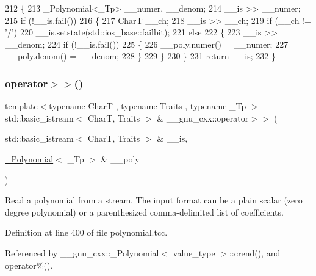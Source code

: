 \begin{DoxyCode}
212     \{
213       \_Polynomial<\_Tp> \_\_numer, \_\_denom;
214       \_\_is >> \_\_numer;
215       \textcolor{keywordflow}{if} (!\_\_is.fail())
216         \{
217           CharT \_\_ch;
218           \_\_is >> \_\_ch;
219           \textcolor{keywordflow}{if} (\_\_ch != \textcolor{charliteral}{'/'})
220             \_\_is.setstate(std::ios\_base::failbit);
221           \textcolor{keywordflow}{else}
222             \{
223               \_\_is >> \_\_denom;
224               \textcolor{keywordflow}{if} (!\_\_is.fail())
225                 \{
226                   \_\_poly.numer() = \_\_numer;
227                   \_\_poly.denom() = \_\_denom;
228                 \}
229             \}
230         \}
231       \textcolor{keywordflow}{return} \_\_is;
232     \}
\end{DoxyCode}
\mbox{\label{namespace____gnu__cxx_acf7d03318756578d08f672212cd91234}} 
\subsubsection{\texorpdfstring{operator$>$$>$()}{operator>>()}\hspace{0.1cm}{\footnotesize\ttfamily [2/2]}}
{\footnotesize\ttfamily template$<$typename CharT , typename Traits , typename \+\_\+\+Tp $>$ \\
std\+::basic\+\_\+istream$<$ CharT, Traits $>$ \& \+\_\+\+\_\+gnu\+\_\+cxx\+::operator$>$$>$ (\begin{DoxyParamCaption}\item[{std\+::basic\+\_\+istream$<$ CharT, Traits $>$ \&}]{\+\_\+\+\_\+is,  }\item[{\hyperlink{class____gnu__cxx_1_1__Polynomial}{\+\_\+\+Polynomial}$<$ \+\_\+\+Tp $>$ \&}]{\+\_\+\+\_\+poly }\end{DoxyParamCaption})}

Read a polynomial from a stream. The input format can be a plain scalar (zero degree polynomial) or a parenthesized comma-\/delimited list of coefficients. 

Definition at line 400 of file polynomial.\+tcc.



Referenced by \+\_\+\+\_\+gnu\+\_\+cxx\+::\+\_\+\+Polynomial$<$ value\+\_\+type $>$\+::crend(), and operator\%().


